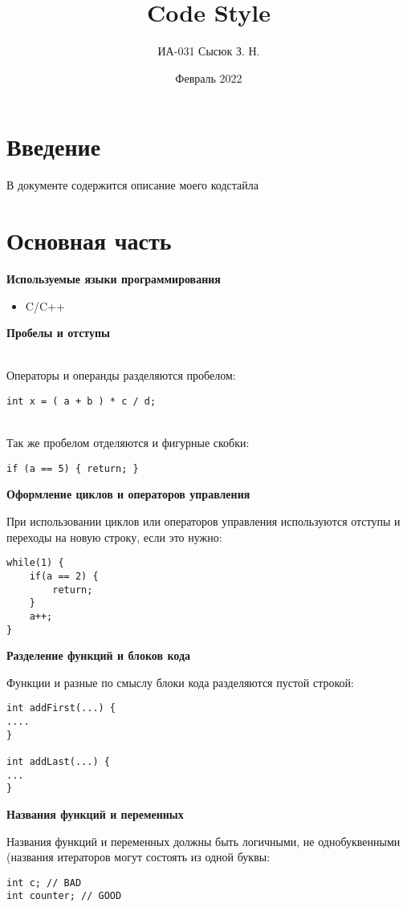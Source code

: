 \documentclass[12pt]{article}
\title{Code Style}
\author{ИА-031 Сысюк З. Н.}
\date{Февраль 2022}
\begin{document}
\lstset{language=C, 
numbers=left,
basicstyle=\small\sffamily}

\maketitle

\section{Введение}
В документе содержится описание моего кодстайла

\section{Основная часть}
\textbf{Используемые языки программирования}
\begin{itemize}
    \item C/C++
\end{itemize}
\textbf{Пробелы и отступы}

\\Операторы и операнды разделяются пробелом:

\begin{lstlisting}
int x = ( a + b ) * c / d;
\end{lstlisting}

\\Так же пробелом отделяются и фигурные скобки:

\begin{lstlisting}
if (a == 5) { return; }
\end{lstlisting}
\textbf{Оформление циклов и операторов управления}

При использовании циклов или операторов управления используются отступы и переходы на новую строку, если это нужно:

\begin{lstlisting}
while(1) { 
    if(a == 2) {
        return;
    }
    a++;
}
\end{lstlisting}
\textbf{Разделение функций и блоков кода}

Функции и разные по смыслу блоки кода разделяются пустой строкой:
\begin{lstlisting}
int addFirst(...) {
....
}

int addLast(...) {
...
}
\end{lstlisting}
\textbf{Названия функций и переменных}

Названия функций и переменных должны быть логичными, не однобуквенными (названия итераторов могут состоять из одной буквы:
\begin{lstlisting}
int c; // BAD
int counter; // GOOD
\end{lstlisting}
\end{document}
